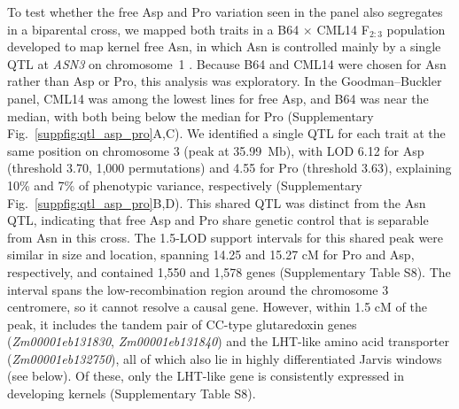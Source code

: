 To test whether the free Asp and Pro variation seen in the panel also segregates in a biparental cross, we mapped both traits in a B64 $\times$ CML14 F$_{2:3}$ population developed to map kernel free Asn, in which Asn is controlled mainly by a single QTL at \textit{ASN3} on chromosome~1 \citep{Fitzsimmons2026KernelKitchen}. Because B64 and CML14 were chosen for Asn rather than Asp or Pro, this analysis was exploratory. In the Goodman--Buckler panel, CML14 was among the lowest lines for free Asp, and B64 was near the median, with both being below the median for Pro (Supplementary Fig.~\ref{suppfig:qtl_asp_pro}A,C). We identified a single QTL for each trait at the same position on chromosome 3 (peak at 35.99~Mb), with LOD 6.12 for Asp (threshold 3.70, 1,000 permutations) and 4.55 for Pro (threshold 3.63), explaining 10\% and 7\% of phenotypic variance, respectively (Supplementary Fig.~\ref{suppfig:qtl_asp_pro}B,D). This shared QTL was distinct from the Asn QTL, indicating that free Asp and Pro share genetic control that is separable from Asn in this cross. The 1.5-LOD support intervals for this shared peak were similar in size and location, spanning 14.25 and 15.27 cM for Pro and Asp, respectively, and contained 1,550 and 1,578 genes (Supplementary Table S8). The interval spans the low-recombination region around the chromosome 3 centromere, so it cannot resolve a causal gene. However, within 1.5 cM of the peak, it includes the tandem pair of CC-type glutaredoxin genes (\textit{Zm00001eb131830}, \textit{Zm00001eb131840}) and the LHT-like amino acid transporter (\textit{Zm00001eb132750}), all of which also lie in highly differentiated Jarvis windows (see below). Of these, only the LHT-like gene is consistently expressed in developing kernels (Supplementary Table S8).


